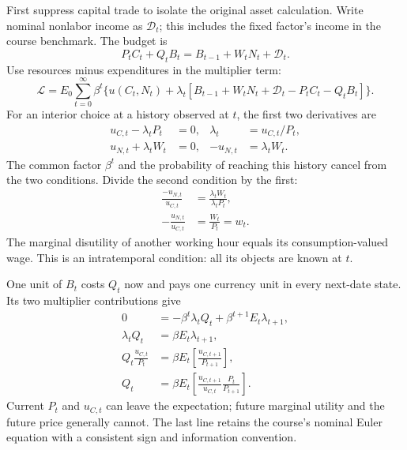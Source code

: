 First suppress capital trade to isolate the original asset calculation. Write
nominal nonlabor income as $\mathcal D_t$; this includes the fixed factor's
income in the course benchmark. The budget is
\begin{equation}\label{eq:rbc-course-budget}
P_tC_t+Q_tB_t=B_{t-1}+W_tN_t+\mathcal D_t.
\end{equation}
Use resources minus expenditures in the multiplier term:
\begin{equation}
\mathscr L=E_0\sum_{t=0}^\infty\beta^t
\{u(C_t,N_t)+\lambda_t[B_{t-1}+W_tN_t+\mathcal D_t-P_tC_t-Q_tB_t]\}.
\end{equation}
For an interior choice at a history observed at $t$, the first two derivatives are
\begin{align}
u_{C,t}-\lambda_tP_t&=0,
 &\lambda_t&=u_{C,t}/P_t,\\
u_{N,t}+\lambda_tW_t&=0,
 &-u_{N,t}&=\lambda_tW_t.
\end{align}
The common factor $\beta^t$ and the probability of reaching this history cancel
from the two conditions. Divide the second condition by the first:
\begin{align}
\frac{-u_{N,t}}{u_{C,t}}&=\frac{\lambda_tW_t}{\lambda_tP_t},\\
-\frac{u_{N,t}}{u_{C,t}}&=\frac{W_t}{P_t}=w_t.\label{eq:rbc-labor-general}
\end{align}
The marginal disutility of another working hour equals its consumption-valued
wage. This is an intratemporal condition: all its objects are known at $t$.

One unit of $B_t$ costs $Q_t$ now and pays one currency unit in every next-date
state. Its two multiplier contributions give
\begin{align}
0&=-\beta^t\lambda_tQ_t+\beta^{t+1}E_t\lambda_{t+1},\\
\lambda_tQ_t&=\beta E_t\lambda_{t+1},\\
Q_t\frac{u_{C,t}}{P_t}&=\beta E_t\!\left[\frac{u_{C,t+1}}{P_{t+1}}\right],\\
Q_t&=\beta E_t\!\left[
\frac{u_{C,t+1}}{u_{C,t}}\frac{P_t}{P_{t+1}}\right].\label{eq:rbc-nominal-euler}
\end{align}
Current $P_t$ and $u_{C,t}$ can leave the expectation; future marginal utility
and the future price generally cannot. The last line retains the course's
nominal Euler equation with a consistent sign and information convention.

